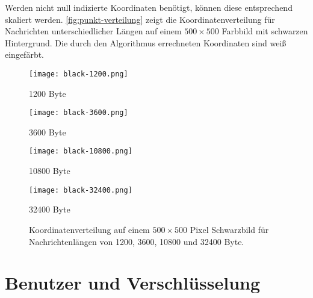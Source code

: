Werden nicht null indizierte Koordinaten benötigt, können diese entsprechend skaliert werden.
\autoref{fig:punkt-verteilung} zeigt die Koordinatenverteilung für Nachrichten unterschiedlicher
Längen auf einem $500 \times 500$ Farbbild mit schwarzen Hintergrund. Die durch den Algorithmus
errechneten Koordinaten sind weiß eingefärbt.
\begin{figure}
  \centering
  \begin{minipage}[t]{0.45\textwidth}
    \texttt{[image: black-1200.png]}
    \caption*{1200 Byte}
  \end{minipage}
  \hfill
  \begin{minipage}[t]{0.45\textwidth}
    \texttt{[image: black-3600.png]}
    \caption*{3600 Byte}
  \end{minipage}%
  \vspace{0.5cm}
  \begin{minipage}[t]{0.45\textwidth}
    \texttt{[image: black-10800.png]}
    \caption*{10800 Byte}
  \end{minipage}
  \hfill
  \begin{minipage}[t]{0.45\textwidth}
    \texttt{[image: black-32400.png]}
    \caption*{32400 Byte}
  \end{minipage}
  \caption{Koordinatenverteilung auf einem $500 \times 500$ Pixel Schwarzbild für Nachrichtenlängen von 1200, 3600, 10800 und 32400 Byte.}
  \label{fig:punkt-verteilung}
\end{figure}

\newpage
\section{Benutzer und Verschlüsselung}
